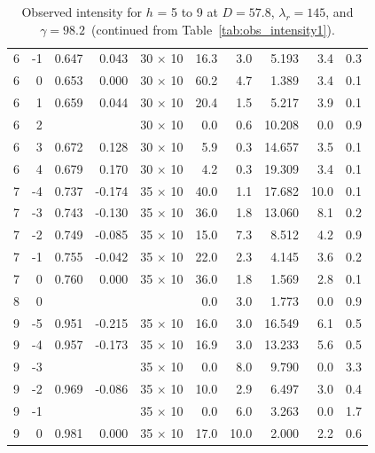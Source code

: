 \begin{table}[htbp]
\begin{tabular}{rrrrcrrrrr}
  6        & -1       & 0.647    & 0.043    & 30 $\times$ 10 & 16.3     & 3.0      & 5.193     & 3.4      & 0.3 \\
  6        & 0        & 0.653    & 0.000    & 30 $\times$ 10 & 60.2     & 4.7      & 1.389     & 3.4      & 0.1 \\
  6        & 1        & 0.659    & 0.044    & 30 $\times$ 10 & 20.4     & 1.5      & 5.217     & 3.9      & 0.1 \\
  6        & 2        &          &          & 30 $\times$ 10 & 0.0      & 0.6      & 10.208    & 0.0      & 0.9 \\
  6        & 3        & 0.672    & 0.128    & 30 $\times$ 10 & 5.9      & 0.3      & 14.657    & 3.5      & 0.1 \\
  6        & 4        & 0.679    & 0.170    & 30 $\times$ 10 & 4.2      & 0.3      & 19.309    & 3.4      & 0.1 \\
  7        & -4       & 0.737    & -0.174   & 35 $\times$ 10 & 40.0     & 1.1      & 17.682    & 10.0     & 0.1 \\
  7        & -3       & 0.743    & -0.130   & 35 $\times$ 10 & 36.0     & 1.8      & 13.060    & 8.1      & 0.2 \\
  7        & -2       & 0.749    & -0.085   & 35 $\times$ 10 & 15.0     & 7.3      & 8.512     & 4.2      & 0.9 \\
  7        & -1       & 0.755    & -0.042   & 35 $\times$ 10 & 22.0     & 2.3      & 4.145     & 3.6      & 0.2 \\
  7        & 0        & 0.760    & 0.000    & 35 $\times$ 10 & 36.0     & 1.8      & 1.569     & 2.8      & 0.1 \\
  8        & 0        &          &          &                & 0.0      & 3.0      & 1.773     & 0.0      & 0.9 \\
  9        & -5       & 0.951    & -0.215   & 35 $\times$ 10 & 16.0     & 3.0      & 16.549    & 6.1      & 0.5 \\
  9        & -4       & 0.957    & -0.173   & 35 $\times$ 10 & 16.9     & 3.0      & 13.233    & 5.6      & 0.5 \\
  9        & -3       &          &          & 35 $\times$ 10 & 0.0      & 8.0      & 9.790     & 0.0      & 3.3 \\
  9        & -2       & 0.969    & -0.086   & 35 $\times$ 10 & 10.0     & 2.9      & 6.497     & 3.0      & 0.4 \\
  9        & -1       &          &          & 35 $\times$ 10 & 0.0      & 6.0      & 3.263     & 0.0      & 1.7 \\
  9        & 0        & 0.981    & 0.000    & 35 $\times$ 10 & 17.0     & 10.0     & 2.000     & 2.2      & 0.6 \\
    \hline
  \end{tabular}
  \caption{Observed intensity for $h$ = 5 to 9 at $D=57.8$, $\lambda_r=145$, and 
  $\gamma=98.2$\textdegree\ (continued from Table~\ref{tab:obs_intensity1}).}
  \label{tab:obs_intensity2}
\end{table}

